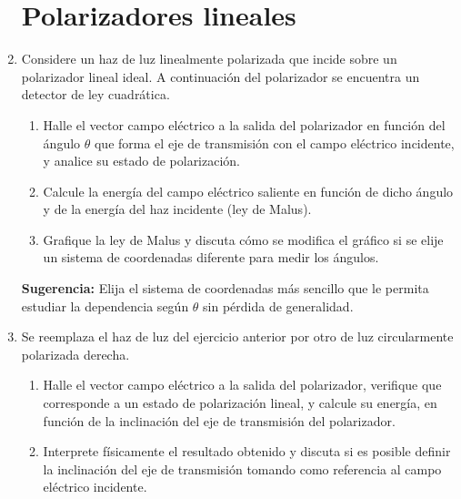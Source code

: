 \documentclass[11pt,spanish]{article}
\begin{document}
\begin{enumerate}
\section*{Polarizadores lineales}


    \item Considere un haz de luz linealmente polarizada que incide sobre un
    polarizador lineal ideal. A continuación del polarizador se encuentra un
    detector de ley cuadrática.
    
    \begin{enumerate}
        \item Halle el vector campo eléctrico a la salida del polarizador en
        función del ángulo $\theta$ que forma el eje de transmisión con el campo
        eléctrico incidente, y analice su estado de polarización.
        
        \item Calcule la energía del campo eléctrico saliente en función de
        dicho ángulo y de la energía del haz incidente (ley de Malus).
        
        \item Grafique la ley de Malus y discuta cómo se modifica el gráfico si
        se elije un sistema de coordenadas diferente para medir los ángulos.
    \end{enumerate}
    
    \textbf{Sugerencia:} Elija el sistema de coordenadas más sencillo que le
    permita estudiar la dependencia según $\theta$ sin pérdida de generalidad. 


    \item Se reemplaza el haz de luz del ejercicio anterior por otro de luz
    circularmente polarizada derecha.
    
    \begin{enumerate}
        \item Halle el vector campo eléctrico a la salida del polarizador,
        verifique que corresponde a un estado de polarización lineal, y calcule
        su energía, en función de la inclinación del eje de transmisión del
        polarizador.
        
        \item Interprete físicamente el resultado obtenido y discuta si es
        posible definir la inclinación del eje de transmisión tomando como
        referencia al campo eléctrico incidente.
        

\end{enumerate}
\end{enumerate}
\end{document}

